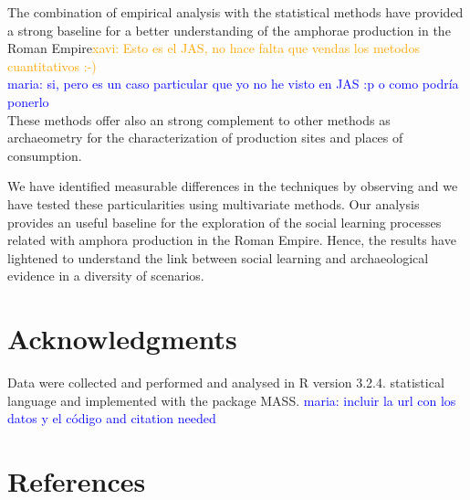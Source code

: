 \documentclass[review]{elsarticle}
\newcommand{\memo}[2]{\textcolor{#1}{#2}}
\newcommand{\xavi}[1]{\memo{orange}{xavi: #1\\}}
\newcommand{\maria}[1]{\memo{blue}{maria: #1\\}}
\begin{document}
The combination of empirical analysis with the statistical methods have provided a strong baseline for a better understanding of the amphorae production in the Roman Empire\xavi{Esto es el JAS, no hace falta que vendas los metodos cuantitativos :-)}
\maria{si, pero es un caso particular que yo no he visto en JAS :p o como podría ponerlo} These methods offer also an strong complement to other methods as archaeometry for the characterization of production sites and places of consumption.  

We have identified measurable differences in the techniques by observing and we have tested these particularities using multivariate methods. Our analysis provides an useful baseline for the exploration of the social learning processes related with amphora production in the Roman Empire. Hence, the results have lightened to understand the link between social learning and archaeological evidence in a diversity of scenarios. 

\section{Acknowledgments}

Data were collected and performed and analysed in R version 3.2.4. statistical language and implemented with the package MASS.
\maria{incluir la url con los datos y el código and citation needed}





\section*{References}

%

\end{document}

